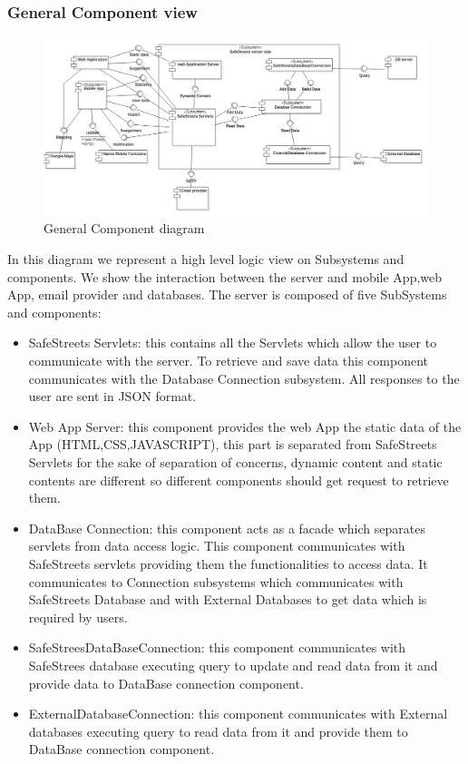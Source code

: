 \subsubsection{General Component view}
\begin{figure}[H]
\centering
\includegraphics[width=\textwidth]{Images/GenericComponentDiagram.png}
\caption{\label{fig:ComWI}General Component diagram}
\end{figure}
In this diagram we represent a high level logic view on Subsystems and components. We show the interaction between the server and mobile App,web App, email provider and databases.
The server is composed of five SubSystems and components:
\begin{itemize}
\item  SafeStreets Servlets: this contains all the Servlets which allow the user to communicate with the server. To retrieve and save data this component communicates with the Database Connection subsystem. All responses to the user are sent in JSON format. 
\item Web App Server: this component provides the web App the static data of the App (HTML,CSS,JAVASCRIPT), this part is separated from SafeStreets Servlets for the sake of separation of concerns, dynamic content and static contents are different so different components should get request to retrieve them.
\item DataBase Connection: this component acts as a facade which separates servlets from data access logic. This component communicates with SafeStreets servlets providing them the functionalities to access data.
It communicates to Connection subsystems which communicates with SafeStreets Database and with External Databases to get data which is required by users.
\item SafeStreesDataBaseConnection: this component communicates with SafeStrees database executing query to update and read data from it and provide data to DataBase connection component. 
\item ExternalDatabaseConnection: this component communicates with External databases executing query to read data from it and provide them to DataBase connection component.
\end{itemize}
